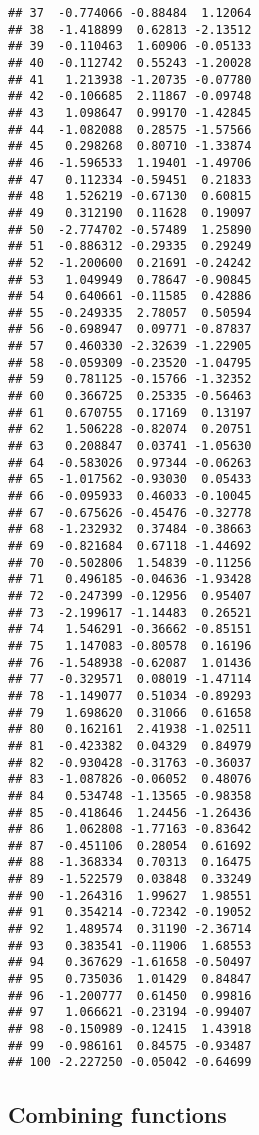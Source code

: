 \documentclass[12pt,a4paper]{scrartcl}\usepackage[]{graphicx}\usepackage[]{color}
\makeatletter
\newenvironment{kframe}{%
 \def\at@end@of@kframe{}%
 \ifinner\ifhmode%
  \def\at@end@of@kframe{\end{minipage}}%
  \begin{minipage}{\columnwidth}%
 \fi\fi%
 \def\FrameCommand##1{\hskip\@totalleftmargin \hskip-\fboxsep
 \colorbox{shadecolor}{##1}\hskip-\fboxsep
     \hskip-\linewidth \hskip-\@totalleftmargin \hskip\columnwidth}%
 \MakeFramed {\advance\hsize-\width
   \@totalleftmargin\z@ \linewidth\hsize
   \@setminipage}}%
 {\par\unskip\endMakeFramed%
 \at@end@of@kframe}
\newenvironment{knitrout}{}{} %
\makeatother
\begin{document}
\begin{Answer}
\begin{knitrout}
\begin{kframe}
\begin{verbatim}
## 37  -0.774066 -0.88484  1.12064
## 38  -1.418899  0.62813 -2.13512
## 39  -0.110463  1.60906 -0.05133
## 40  -0.112742  0.55243 -1.20028
## 41   1.213938 -1.20735 -0.07780
## 42  -0.106685  2.11867 -0.09748
## 43   1.098647  0.99170 -1.42845
## 44  -1.082088  0.28575 -1.57566
## 45   0.298268  0.80710 -1.33874
## 46  -1.596533  1.19401 -1.49706
## 47   0.112334 -0.59451  0.21833
## 48   1.526219 -0.67130  0.60815
## 49   0.312190  0.11628  0.19097
## 50  -2.774702 -0.57489  1.25890
## 51  -0.886312 -0.29335  0.29249
## 52  -1.200600  0.21691 -0.24242
## 53   1.049949  0.78647 -0.90845
## 54   0.640661 -0.11585  0.42886
## 55  -0.249335  2.78057  0.50594
## 56  -0.698947  0.09771 -0.87837
## 57   0.460330 -2.32639 -1.22905
## 58  -0.059309 -0.23520 -1.04795
## 59   0.781125 -0.15766 -1.32352
## 60   0.366725  0.25335 -0.56463
## 61   0.670755  0.17169  0.13197
## 62   1.506228 -0.82074  0.20751
## 63   0.208847  0.03741 -1.05630
## 64  -0.583026  0.97344 -0.06263
## 65  -1.017562 -0.93030  0.05433
## 66  -0.095933  0.46033 -0.10045
## 67  -0.675626 -0.45476 -0.32778
## 68  -1.232932  0.37484 -0.38663
## 69  -0.821684  0.67118 -1.44692
## 70  -0.502806  1.54839 -0.11256
## 71   0.496185 -0.04636 -1.93428
## 72  -0.247399 -0.12956  0.95407
## 73  -2.199617 -1.14483  0.26521
## 74   1.546291 -0.36662 -0.85151
## 75   1.147083 -0.80578  0.16196
## 76  -1.548938 -0.62087  1.01436
## 77  -0.329571  0.08019 -1.47114
## 78  -1.149077  0.51034 -0.89293
## 79   1.698620  0.31066  0.61658
## 80   0.162161  2.41938 -1.02511
## 81  -0.423382  0.04329  0.84979
## 82  -0.930428 -0.31763 -0.36037
## 83  -1.087826 -0.06052  0.48076
## 84   0.534748 -1.13565 -0.98358
## 85  -0.418646  1.24456 -1.26436
## 86   1.062808 -1.77163 -0.83642
## 87  -0.451106  0.28054  0.61692
## 88  -1.368334  0.70313  0.16475
## 89  -1.522579  0.03848  0.33249
## 90  -1.264316  1.99627  1.98551
## 91   0.354214 -0.72342 -0.19052
## 92   1.489574  0.31190 -2.36714
## 93   0.383541 -0.11906  1.68553
## 94   0.367629 -1.61658 -0.50497
## 95   0.735036  1.01429  0.84847
## 96  -1.200777  0.61450  0.99816
## 97   1.066621 -0.23194 -0.99407
## 98  -0.150989 -0.12415  1.43918
## 99  -0.986161  0.84575 -0.93487
## 100 -2.227250 -0.05042 -0.64699
\end{verbatim}
\end{kframe}
\end{knitrout}
\end{Answer}
\clearpage

\subsection{Combining functions}
\end{document}
